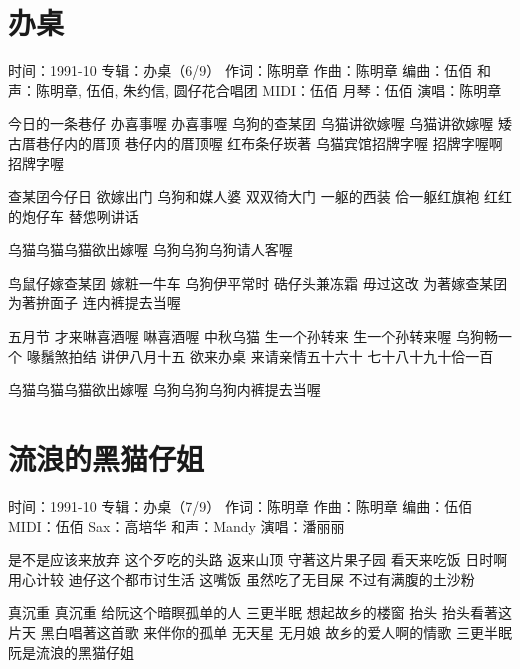 \documentclass[UTF8,a4paper,oneside,twocolumn,12pt]{ctexbook}
\newcommand{\infopair}[2]{\textbullet #1：#2}
\newcommand{\zc}[1][伍佰]{\infopair{作词}{#1}}
\newcommand{\zq}[1][伍佰]{\infopair{作曲}{#1}}
\newcommand{\bq}[1][伍佰]{\infopair{编曲}{#1}}
\newcommand{\zj}[1]{\infopair{专辑}{#1}}
\newcommand{\sj}[1]{\infopair{时间}{#1}}
\newenvironment{info}{\begin{flushleft}\kaishu
	}
	{\end{flushleft}\normalsize\yahei\par}
\newenvironment{lyric}{
	}
{}
\begin{document}
\section{办桌}
\begin{info}
	\sj{1991-10}
	\zj{办桌（6/9）}
	\zc[陈明章]
	\zq[陈明章]
	\bq[伍佰]
	\infopair{和声}{陈明章, 伍佰, 朱约信, 圆仔花合唱团}
	\infopair{MIDI}{伍佰}
	\infopair{月琴}{伍佰}
	\infopair{演唱}{陈明章}
\end{info}
\begin{lyric}
	今日的一条巷仔 办喜事喔 办喜事喔
	乌狗的查某囝 乌猫讲欲嫁喔 乌猫讲欲嫁喔
	矮古厝巷仔内的厝顶 巷仔内的厝顶喔
	红布条仔崁著 乌猫宾馆招牌字喔 招牌字喔啊招牌字喔

	查某囝今仔日 欲嫁出门
	乌狗和媒人婆 双双徛大门
	一躯的西装 佮一躯红旗袍
	红红的炮仔车 替怹咧讲话

	乌猫乌猫乌猫欲出嫁喔
	乌狗乌狗乌狗请人客喔

	鸟鼠仔嫁查某囝 嫁粧一牛车
	乌狗伊平常时 硞仔头兼冻霜
	毋过这改 为著嫁查某囝
	为著拚面子 连内裤提去当喔

	五月节 才来啉喜酒喔 啉喜酒喔
	中秋乌猫 生一个孙转来
	生一个孙转来喔
	乌狗畅一个 喙鬚煞拍结
	讲伊八月十五 欲来办桌
	来请亲情五十六十 七十八十九十佮一百

	乌猫乌猫乌猫欲出嫁喔
	乌狗乌狗乌狗内裤提去当喔
\end{lyric}

\section{流浪的黑猫仔姐}
\begin{info}
	\sj{1991-10}
	\zj{办桌（7/9）}
	\zc[陈明章]
	\zq[陈明章]
	\bq[伍佰]
	\infopair{MIDI}{伍佰}
	\infopair{Sax}{高培华}
	\infopair{和声}{Mandy}
	\infopair{演唱}{潘丽丽}
\end{info}
\begin{lyric}
	是不是应该来放弃 这个歹吃的头路
	返来山顶
	守著这片果子园 看天来吃饭
	日时啊用心计较
	迪仔这个都市讨生活
	这嘴饭
	虽然吃了无目屎 不过有满腹的土沙粉

	真沉重 真沉重
	给阮这个暗瞑孤单的人
	三更半眠 想起故乡的楼窗
	抬头 抬头看著这片天
	黑白唱著这首歌 来伴你的孤单
	无天星 无月娘 故乡的爱人啊的情歌
	三更半眠 阮是流浪的黑猫仔姐
\end{lyric}
\end{document}
